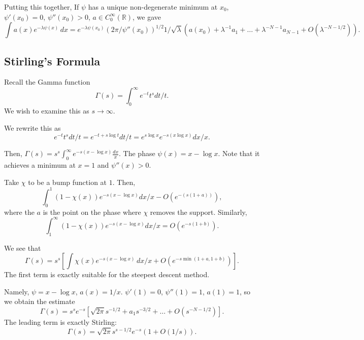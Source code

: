 \documentclass[12pt]{scrartcl}
\newcommand{\R}{\mathbb{R}}
\newcommand{\<}{\langle}
\renewcommand{\>}{\rangle}
\begin{document}
Putting this together, If $\psi$ has a unique non-degenerate minimum at $x_0$, $\psi'(x_0) = 0$, $\psi''(x_0) > 0$, $a \in C_0^\infty(\R)$, we gave
$$\int a(x) e^{-\lambda\psi(x)}\, dx = e^{-\lambda \psi(x_0)} (2\pi/\psi''(x_0))^{1/2} 1/\sqrt{\lambda} (a(x_0) + \lambda^{-1} a_1 + \dots + \lambda^{-N-1} a_{N-1} + O(\lambda^{-N - 1/2})).$$

\subsection{Stirling's Formula}
Recall the Gamma function
$$\Gamma(s) = \int_0^\infty e^{-t} t^s dt/t.$$
We wish to examine this as $s \to \infty$.

We rewrite this as 
$$e^{-t} t^s dt/t = e^{-t + s\log t} dt/t = e^{s \log x}e^{-s(x \log x)}dx/x.$$

Then, $\Gamma(s) = s^s \int_0^\infty e^{-s(x - \log x)}\frac{dx}{x}.$  The phase $\psi(x) = x - \log x$.  Note that it achieves a minimum at $x = 1$ and $\psi''(x) > 0$.

Take $\chi$ to be a bump function at $1$.  Then,
$$\int_0^1 (1 - \chi(x)) e^{-s(x - \log x)} dx/x - O(e^{-(s(1 + a))}),$$
where the $a$ is the point on the phase where $\chi$ removes the support.  Similarly,
$$\int_1^\infty (1 - \chi(x)) e^{-s(x - \log x)}dx/x = O(e^{-s(1 + b)}).$$

We see that 
$$\Gamma(s) = s^s[\int \chi(x)e^{-s(x - \log x)} \,dx/x + O(e^{-s \min(1 + a, 1 + b)})].$$
The first term is exactly suitable for the steepest descent method.  

Namely, $\psi = x - \log x$, $a(x) = 1/x$.  $\psi'(1) = 0$, $\psi''(1) = 1$, $a(1) = 1$, so we obtain the estimate
$$\Gamma(s) = s^s e^{-s}[ \sqrt{2\pi}s^{-1/2} + a_1 s^{-3/2} + \dots + O(s^{-N - 1/2})].$$
The leading term is exactly Stirling:
$$\Gamma(s) = \sqrt{2\pi} s^{s - 1/2} e^{-s}(1 + O(1/s)).$$
\end{document}
